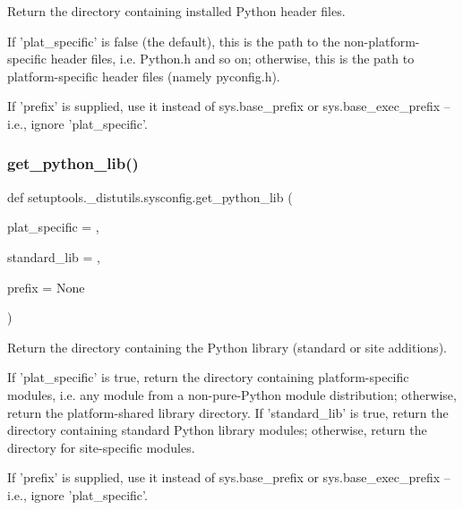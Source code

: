 \begin{DoxyVerb}Return the directory containing installed Python header files.

If 'plat_specific' is false (the default), this is the path to the
non-platform-specific header files, i.e. Python.h and so on;
otherwise, this is the path to platform-specific header files
(namely pyconfig.h).

If 'prefix' is supplied, use it instead of sys.base_prefix or
sys.base_exec_prefix -- i.e., ignore 'plat_specific'.
\end{DoxyVerb}
 \mbox{\label{namespacesetuptools_1_1__distutils_1_1sysconfig_a1ec7e0c564e204dd18365fb4a5dfb46d}} 
\subsubsection{\texorpdfstring{get\+\_\+python\+\_\+lib()}{get\_python\_lib()}}
{\footnotesize\ttfamily def setuptools.\+\_\+distutils.\+sysconfig.\+get\+\_\+python\+\_\+lib (\begin{DoxyParamCaption}\item[{}]{plat\+\_\+specific = {},  }\item[{}]{standard\+\_\+lib = {},  }\item[{}]{prefix = {\ttfamily None} }\end{DoxyParamCaption})}

\begin{DoxyVerb}Return the directory containing the Python library (standard or
site additions).

If 'plat_specific' is true, return the directory containing
platform-specific modules, i.e. any module from a non-pure-Python
module distribution; otherwise, return the platform-shared library
directory.  If 'standard_lib' is true, return the directory
containing standard Python library modules; otherwise, return the
directory for site-specific modules.

If 'prefix' is supplied, use it instead of sys.base_prefix or
sys.base_exec_prefix -- i.e., ignore 'plat_specific'.
\end{DoxyVerb}
 \mbox{\label{namespacesetuptools_1_1__distutils_1_1sysconfig_a89f553c60c49aa98ccb15aeedb84c43b}} 
